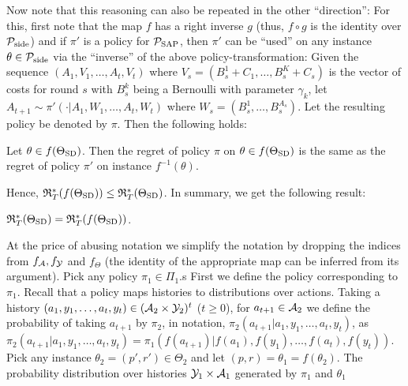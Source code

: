 Now note that this reasoning can also be repeated in the other ``direction'': 
For this, first note that the map $f$ has a right inverse $g$ 
(thus, $f\circ g$ is the identity over $\mathcal{P}_{\mathrm{side}}$)
and if $\pi'$ is a policy for $\mathcal{P}_{\mathrm{SAP}}$, 
then $\pi'$ can be ``used''  on any instance $\theta\in \mathcal{P}_{\mathrm{side}}$
via the ``inverse'' of the above policy-transformation:
Given the sequence $(A_1,V_1,\dots,A_t,V_t)$ where 
$V_s= (B_s^1+C_1,\dots,B_ s^{K}+C_s)$ is the vector of costs for round $s$
with $B_s^k$ being a Bernoulli with parameter $\gamma_k$,
let $A_{t+1} \sim \pi'( \cdot| A_1,W_1,\dots,A_t,W_t)$ where
$W_s = (B_s^1,\dots,B_s^{A_s})$. Let the resulting policy be denoted by $\pi$.
Then the following holds:
\begin{prop}
Let $\theta \in f(\Theta_{\mathrm{SD}})$. Then the regret of policy $\pi$ on $\theta\in f(\Theta_{\mathrm{SD}})$ is the same
as the regret of policy $\pi'$ on instance $f^{-1}(\theta)$.
\end{prop}
Hence, $\mathfrak{R}_T^*(f(\Theta_{\mathrm{SD}}))\le \mathfrak{R}_T^*(\Theta_{\mathrm{SD}})$.
In summary, we get the following result:
\begin{cor}
$\mathfrak{R}_T^*(\Theta_{\mathrm{SD}}) = \mathfrak{R}_T^*(f(\Theta_{\mathrm{SD}}))$. 
\end{cor}

At the price of abusing notation 
we simplify the notation by dropping the indices from $f_{\mathcal{A}}, f_{\mathcal{Y}}$ and $f_{\Theta}$ (the identity of the appropriate map can be inferred from its argument).
Pick any policy $\pi_1\in \Pi_1$.s
First we define the policy corresponding to $\pi_1$.
Recall that a policy maps histories to distributions over actions.
Taking a history $(a_1,y_1,\dots,a_t,y_t)\in (\mathcal{A}_2\times \mathcal{Y}_2)^t$ ($t\ge 0$),
for $a_{t+1}\in \mathcal{A}_2$ we define the probability of taking $a_{t+1}$ by $\pi_2$, in notation,
 $\pi_2(a_{t+1}|a_1,y_1,\dots,a_t,y_t)$, as
 $\pi_2(a_{t+1}|a_1,y_1,\dots,a_t,y_t) = \pi_1(f(a_{t+1})|f(a_1),f(y_1),\dots,f(a_t),f(y_t))$.
Pick any instance $\theta_2 = (p',r')\in \Theta_2$ and let $(p,r) = \theta_1  = f( \theta_2)$.
The probability distribution over histories $\mathcal{Y}_1 \times \mathcal{A}_1$ generated by $\pi_1$ and $\theta_1$
\fi



